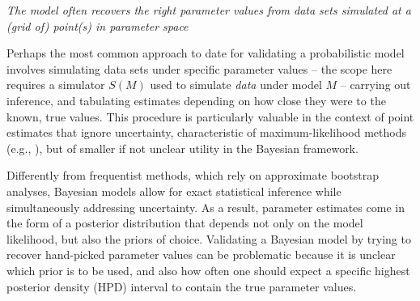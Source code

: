 \documentclass[oneside]{article}
\begin{document}





\vspace{.5cm}
\noindent \emph{The model often recovers the right parameter values
  from data sets simulated at a (grid of) point(s) in parameter space}

Perhaps the most common approach to date for validating a
probabilistic model involves simulating data sets under specific parameter
values -- the scope here requires a simulator $S(M)$ used to simulate
\emph{data} under model $M$ -- carrying out inference, and tabulating
estimates depending on how close they were to the known, true values.
This procedure is particularly valuable in the context of point estimates
that ignore uncertainty, characteristic of maximum-likelihood methods (e.g.,
\citealp{mccormack09,han13,mendes17}), but of smaller if not unclear
utility in the Bayesian framework.

Differently from frequentist methods, which rely on approximate bootstrap
analyses, Bayesian models allow for exact statistical inference while
simultaneously addressing uncertainty.
As a result, parameter estimates come in the form of a posterior
distribution that depends not only on the model likelihood, but
also the priors of choice.
Validating a Bayesian model by trying to recover
hand-picked parameter values can be problematic because it is unclear
which prior is to be used, and also how often one should
expect a specific highest posterior density (HPD) interval to contain
the true parameter values.
\end{document}
